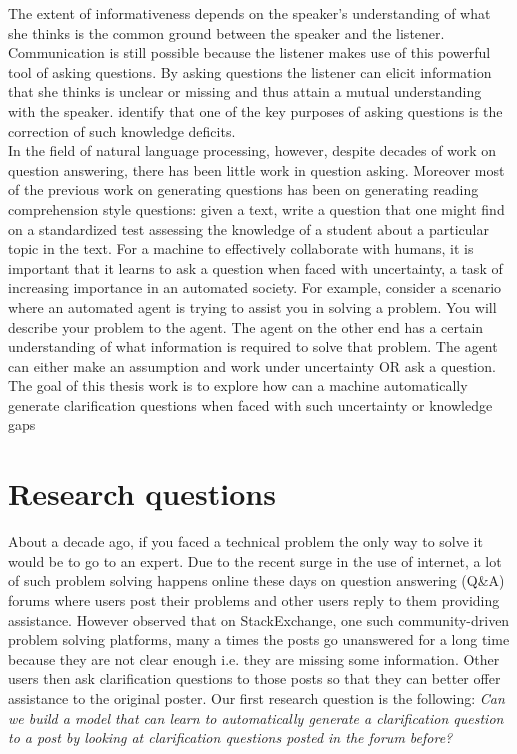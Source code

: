 \documentclass[11pt]{report}
\begin{document}
The extent of informativeness depends on the speaker's understanding of what she thinks is the common ground between the speaker and the listener. Communication is still possible because the listener makes use of this powerful tool of asking questions. By asking questions the listener can elicit information that she thinks is unclear or missing and thus attain a mutual understanding with the speaker. \cite{graesser2008question} identify that one of the key purposes of asking questions is the correction of such knowledge deficits.\\

\noindent
In the field of natural language processing, however, despite decades of work on question answering, there has been little work in question asking. Moreover most of the previous work on generating questions has been on generating reading comprehension style questions: given a text, write a question that one might find on a standardized test assessing the knowledge of a student about a particular topic in the text. For a machine to effectively collaborate with humans, it is important that it learns to ask a question when faced with uncertainty, a task of increasing importance in an automated society. For example, consider a scenario where an automated agent is trying to assist you in solving a problem. You will describe your problem to the agent. The agent on the other end has a certain understanding of what information is required to solve that problem. The agent can either make an assumption and work under uncertainty OR ask a question. The goal of this thesis work is to explore how can a machine automatically generate clarification questions when faced with such uncertainty or knowledge gaps

\section{Research questions}

About a decade ago, if you faced a technical problem the only way to solve it would be to go to an expert. Due to the recent surge in the use of internet, a lot of such problem solving happens online these days on question answering (Q\&A) forums where users post their problems and other users reply to them providing assistance. However \cite{asaduzzaman2013answering} observed that on StackExchange, one such community-driven problem solving platforms, many a times the posts go unanswered for a long time because they are not clear enough i.e. they are missing some information. Other users then ask clarification questions to those posts so that they can better offer assistance to the original poster. Our first research question is the following: \textit{Can we build a model that can learn to automatically generate a clarification question to a post by looking at clarification questions posted in the forum before?}\\
\end{document}
